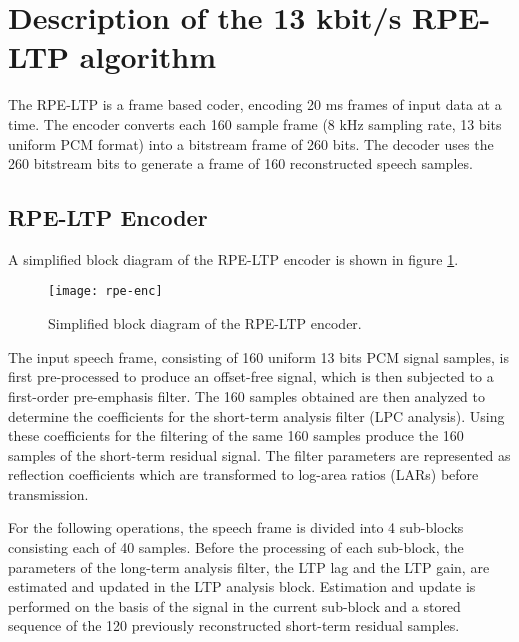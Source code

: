 \section{Description of the 13 kbit/s RPE-LTP algorithm}
\label{principles}
The RPE-LTP is a frame based coder, encoding 20 ms frames of
input data at a time.
The encoder converts each 160 sample frame (8 kHz sampling rate,
13 bits uniform PCM format) into a bitstream frame of 260 bits.
The decoder uses the 260 bitstream bits to generate
a frame of 160 reconstructed speech samples.


\subsection{RPE-LTP Encoder}
A simplified block diagram of the RPE-LTP encoder \cite{GSM-06.10} is
shown in figure \ref{rpe-encoder}.

\begin{figure}
  \begin{center}
    \texttt{[image: rpe-enc]}
  \end{center}
  \caption{Simplified block diagram of the RPE-LTP encoder.
           \label{rpe-encoder}}
\end{figure}

The input speech frame, consisting of 160 uniform 13 bits PCM signal
samples, is first pre-processed to produce an offset-free signal, which
is then subjected to a first-order pre-emphasis filter. The 160
samples obtained are then analyzed to determine the coefficients for
the short-term analysis filter (LPC analysis). Using these coefficients
for the filtering of the same 160 samples produce the 160 samples of
the short-term residual signal. The filter parameters are represented
as reflection coefficients which are transformed to
log-area ratios (LARs) before transmission.

For the following operations, the speech frame is divided into 4
sub-blocks consisting each of 40 samples.
Before the processing of each sub-block, the parameters of the
long-term analysis filter, the LTP lag and the LTP gain, are estimated and
updated in the LTP analysis block. Estimation and update is performed
on the basis of the signal in the current sub-block and a stored
sequence of the 120 previously reconstructed short-term residual
samples.

